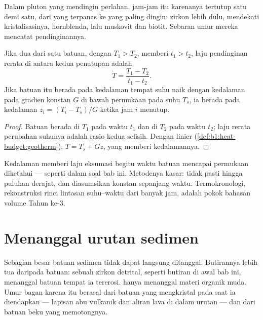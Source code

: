 Dalam pluton yang mendingin perlahan, jam-jam itu karenanya tertutup satu demi satu, dari yang terpanas ke yang paling dingin: zirkon lebih dulu, mendekati kristalisasinya,
hornblenda, lalu muskovit dan biotit. Sebaran umur mereka mencatat
pendinginannya.

\begin{proposition}\label{prop:b1:radiometric-methods:cooling}
Jika dua  dari satu batuan, dengan  $T_1 > T_2$, memberi  $t_1 > t_2$, laju pendinginan rerata di antara kedua penutupan adalah
\[
  \dot T = \frac{T_1 - T_2}{t_1 - t_2}.
\]
Jika batuan itu berada pada kedalaman tempat suhu naik dengan kedalaman pada gradien konstan $G$ di bawah permukaan pada suhu $T_s$, ia berada pada kedalaman $z_i
= (T_i - T_s)/G$ ketika jam $i$ menutup.
\end{proposition}

\begin{proof}
Batuan berada di $T_1$ pada waktu $t_1$ dan di $T_2$ pada waktu $t_2$; laju rerata perubahan suhunya adalah rasio kedua selisih. Dengan  linier (\cref{def:b1:heat-budget:geotherm}), $T = T_s + G z$, yang memberi kedalamannya.
\end{proof}

Kedalaman memberi laju eksumasi begitu waktu batuan mencapai permukaan diketahui --- seperti dalam soal bab ini. Metodenya kasar:  tidak pasti hingga puluhan derajat, dan  diasumsikan konstan sepanjang waktu. Termokronologi, rekonstruksi rinci lintasan suhu--waktu dari banyak jam, adalah pokok bahasan volume Tahun ke-3.

\section{Menanggal urutan sedimen}\label{sec:b1:radiometric-methods:sediments}

Sebagian besar batuan sedimen tidak dapat langsung ditanggal. Butirannya lebih tua daripada batuan: sebuah zirkon detrital, seperti butiran di awal bab ini, menanggal batuan tempat ia tererosi.  hanya menanggal materi organik muda. Umur bagan karena itu berasal dari batuan yang mengkristal pada saat ia diendapkan --- lapisan abu vulkanik dan aliran lava di dalam urutan --- dan dari batuan beku yang memotongnya.

